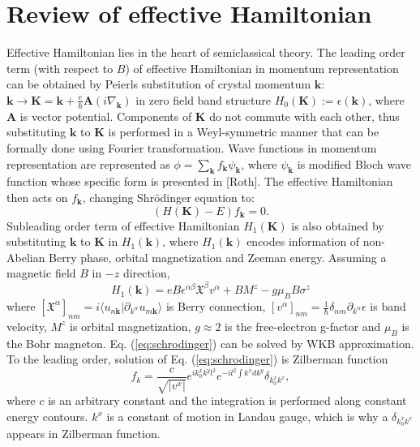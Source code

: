 \documentclass[aps, prb, showpacs, twocolumn, notitlepage, superscriptaddress]{revtex4-1}
\begin{document}



\appendix

\section{Review of effective Hamiltonian}\label{app:revieweffham}

Effective Hamiltonian lies in the heart of semiclassical theory. The leading order term (with respect to $B$) of effective Hamiltonian in momentum representation can be obtained by Peierls substitution of crystal momentum $\boldsymbol{k}$: $\boldsymbol{k}\to\boldsymbol{K}=\boldsymbol{k}+\frac{e}{\hbar}\boldsymbol{A}(i\nabla_{\boldsymbol{k}})$ in zero field band structure $H_{0}(\boldsymbol{K}):=\epsilon(\boldsymbol{k})$, where $\boldsymbol{A}$ is vector potential. Components of $\boldsymbol{K}$ do not commute with each other, thus substituting $\boldsymbol{k}$ to $\boldsymbol{K}$ is performed in a Weyl-symmetric manner that can be formally done using Fourier transformation. Wave functions in momentum representation are represented as $\phi=\sum_{\boldsymbol{k}}f_{\boldsymbol{k}}\psi_{\boldsymbol{k}}$, where $\psi_{\boldsymbol{k}}$ is modified Bloch wave function whose specific form is presented in [Roth]. The effective Hamiltonian then acts on $f_{\boldsymbol{k}}$, changing Shr\"odinger equation to:
\begin{equation}
(H(\boldsymbol{K})-E)f_{\boldsymbol{k}}=0.\label{eq:schrodinger}
\end{equation}
Subleading order term of effective Hamiltonian $H_{1}(\boldsymbol{K})$ is also obtained by substituting $\boldsymbol{k}$ to $\boldsymbol{K}$ in $H_{1}(\boldsymbol{k})$, where $H_{1}(\boldsymbol{k})$ encodes information of non-Abelian Berry phase, orbital magnetization and Zeeman energy. Assuming a magnetic field $B$ in $-z$ direction,
\begin{equation}
H_{1}(\boldsymbol{k})=eB\epsilon^{\alpha\beta}\mathfrak{X}^{\beta}v^{\alpha}+BM^{z}-g\mu_{B}B\sigma^{z}
\end{equation}
where $[\mathfrak{X}^{\alpha}]_{nm}=i\langle u_{n\boldsymbol{k}}|\partial_{k^{\alpha}}u_{m\boldsymbol{k}}\rangle$ is Berry connection, $[v^{\alpha}]_{nm}=\frac{1}{\hbar}\delta_{nm}\partial_{k^{\alpha}}\epsilon$ is band velocity, $M^{z}$ is orbital magnetization, $g\approx 2$ is the free-electron g-factor and $\mu_{B}$ is the Bohr magneton. Eq. (\ref{eq:schrodinger}) can be solved by WKB approximation. To the leading order, solution of Eq. (\ref{eq:schrodinger}) is Zilberman function
\begin{equation}
f_{k}=\frac{c}{\sqrt{|v^{x}|}}e^{ik_{0}^{x}k^{y}l^{2}}e^{-il^{2}\int k^{x}dk^{y}}\delta_{k_{0}^{x}k^{x}},
\end{equation}
where $c$ is an arbitrary constant and the integration is performed along constant energy contours. $k^x$ is a constant of motion in Landau gauge, which is why a $\delta_{k_{0}^{x}k^{x}}$ appears in Zilberman function.
\end{document}
